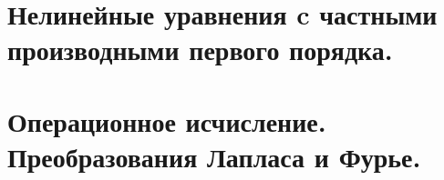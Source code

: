 \documentclass[fleqn, 12pt, a4paper, titlepage]{extarticle}
\begin{document}

		\section*{Нелинейные уравнения c частными производными первого порядка.}
		


		\section*{Операционное исчисление. Преобразования Лапласа и Фурье.}
		

\end{document}
